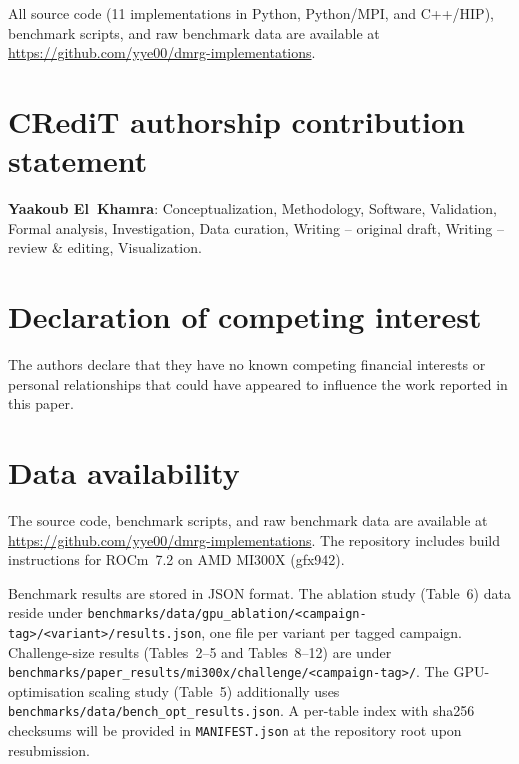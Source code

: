 \documentclass[preprint,12pt]{elsarticle}
\begin{document}
All source code (11 implementations in Python, Python/MPI, and C++/HIP), benchmark scripts, and raw benchmark data are available at \url{https://github.com/yye00/dmrg-implementations}.

\section*{CRediT authorship contribution statement}

\textbf{Yaakoub El~Khamra}: Conceptualization, Methodology, Software, Validation, Formal analysis, Investigation, Data curation, Writing -- original draft, Writing -- review \& editing, Visualization.

\section*{Declaration of competing interest}

The authors declare that they have no known competing financial interests or personal relationships that could have appeared to influence the work reported in this paper.

\section*{Data availability}

The source code, benchmark scripts, and raw benchmark data are available at \url{https://github.com/yye00/dmrg-implementations}.
The repository includes build instructions for ROCm~7.2 on AMD MI300X (gfx942).

Benchmark results are stored in JSON format.
The ablation study (Table~6) data reside under
\texttt{benchmarks/data/gpu\_ablation/\textless{}campaign-tag\textgreater{}/\textless{}variant\textgreater{}/results.json},
one file per variant per tagged campaign.
Challenge-size results (Tables~2--5 and Tables~8--12) are under
\texttt{benchmarks/paper\_results/mi300x/challenge/\textless{}campaign-tag\textgreater{}/}.
The GPU-optimisation scaling study (Table~5) additionally uses
\texttt{benchmarks/data/bench\_opt\_results.json}.
A per-table index with sha256 checksums will be provided in
\texttt{MANIFEST.json} at the repository root upon resubmission.
\end{document}
